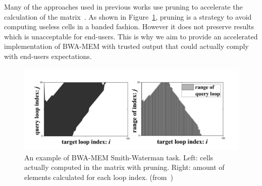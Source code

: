 Many of the approaches used in previous works use pruning to accelerate the calculation of the matrix~\cite{Chen:acc}. As shown in Figure~\ref{fig:banded}, pruning is a strategy to avoid computing useless cells in a banded fashion. However it does not preserve results which is unacceptable for end-users. This is why we aim to provide an accelerated implementation of BWA-MEM with trusted output that could actually comply with end-users expectations.

\begin{figure}[h!]
    \centering
    \includegraphics[width=0.9\linewidth]{banded}
    \caption{An example of BWA-MEM Smith-Waterman task. Left: cells actually computed in the matrix with pruning. Right: amount of elements calculated for each loop index. (from~\cite{Chen:acc})}
    \label{fig:banded}
\end{figure}{}
